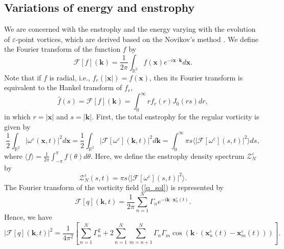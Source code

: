 \documentclass{article}
\theoremstyle{definition}
\begin{document}
\subsection{Variations of energy and enstrophy}
\label{Variations}
We are concerned with  the enstrophy and the energy varying with the evolution of $\varepsilon$-point vortices, which are
 derived based on the Novikov's method \cite{Novikov, Sakajo}. We define the Fourier transform of the function $f$ by
\begin{equation}
\mathscr{F}[f]({\bm k}) = \frac{1}{2 \pi}\int_{\mathbb{R}^2} f({\bm x}) e^{- i {\bm x} \cdot {\bm k}} d {\bm x}. \label{FT}
\end{equation}
Note that if $f$ is radial, i.e., $f_r(\vert{\bm x}\vert) = f({\bm x})$, then its Fourier transform is equivalent to the Hankel transform of $f_r$, 
\begin{equation}
\widehat{f}(s) = \mathscr{F}[f]({\bm k}) = \int_0^\infty r f_r(r) J_0(rs) dr, \label{HT}
\end{equation}
in which $r = \vert{\bm x}\vert$ and $s = \vert{\bm k}\vert$.  First, the total enstrophy for the regular vorticity is given by
\begin{equation*}
\frac{1}{2}\int_{\mathbb{R}^2} \left\vert \omega^\varepsilon({\bm x}, t) \right\vert^2 d{\bm x} = \frac{1}{2}\int_{\mathbb{R}^2} \left\vert \mathscr{F}[\omega^\varepsilon]({\bm k}, t) \right\vert^2 d{\bm k} = \int_0^\infty  \pi s \langle \left\vert \mathscr{F}[\omega^\varepsilon](s,t) \right\vert^2 \rangle ds,
\end{equation*} 
where $\langle f \rangle = \frac{1}{2\pi}\int_{-\pi}^\pi f(\theta) d\theta$. Here, we define the enstrophy density spectrum $\mathscr{Z}_N^\varepsilon$ by 
\begin{equation*}
\mathscr{Z}_N^\varepsilon (s,t) =  \pi s \langle \left\vert \mathscr{F}[\omega^\varepsilon](s,t) \right\vert^2 \rangle. 
\end{equation*}
The Fourier transform of the vorticity field (\ref{q_sol}) is represented by
\begin{equation*}
\mathscr{F}[q]({\bm k}, t) = \frac{1}{2 \pi} \sum_{n=1}^N \Gamma_n e^{- i {\bm k}\cdot {\bm x}_n^\varepsilon(t)}.
\end{equation*}
Hence, we have
\begin{equation*}
\left\vert \mathscr{F}[q]({\bm k}, t) \right\vert^2 = \frac{1}{4 \pi^2} \left[ \sum_{n=1}^N \Gamma_n^2 + 2 \sum_{n=1}^N \sum_{m=n+1}^N \Gamma_n \Gamma_m \cos \left( {\bm k} \cdot ({\bm x}_n^\varepsilon(t) - {\bm x}_m^\varepsilon(t)) \right)  \right].
\end{equation*}
\end{document}
